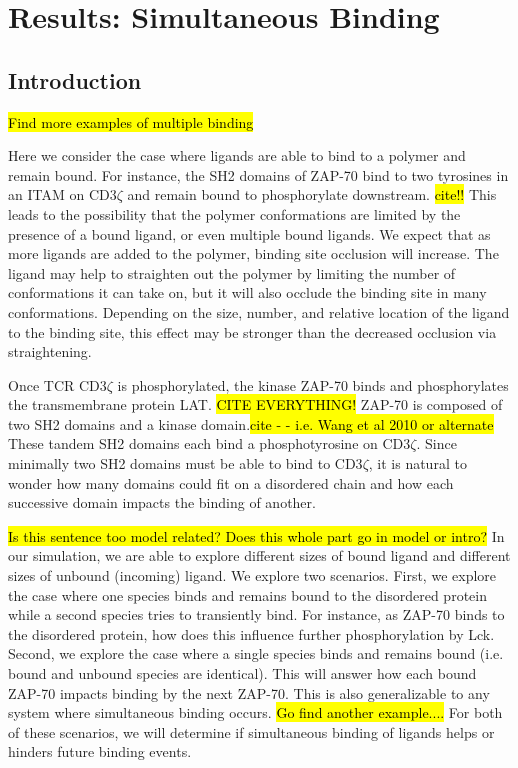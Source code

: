 \documentclass[../../AdvancementSummary.tex]{subfiles}
\begin{document}
\section{Results: Simultaneous Binding}
\label{sec: SimultaneousBinding}
\subsection{Introduction}

\hl{Find more examples of multiple binding}

Here we consider the case where ligands are able to bind to a polymer and remain bound.  For instance, the SH2 domains of ZAP-70 bind to two tyrosines in an ITAM on CD3$\zeta$ and remain bound to phosphorylate downstream. \hl{cite!!} This leads to the possibility that the polymer conformations are limited by the presence of a bound ligand, or even multiple bound ligands.  We expect that as more ligands are added to the polymer, binding site occlusion will increase.  The ligand may help to straighten out the polymer by limiting the number of conformations it can take on, but it will also occlude the binding site in many conformations.  Depending on the size, number, and relative location of the ligand to the binding site, this effect may be stronger than the decreased occlusion via straightening.  

Once TCR CD3$\zeta$ is phosphorylated, the kinase ZAP-70 binds and phosphorylates the transmembrane protein LAT. \hl{CITE EVERYTHING!} ZAP-70 is composed of two SH2 domains and a kinase domain.\hl{cite -  - i.e. Wang et al 2010 or alternate} These tandem SH2 domains each bind a phosphotyrosine on CD3$\zeta$. Since minimally two SH2 domains must be able to bind to CD3$\zeta$, it is natural to wonder how many domains could fit on a disordered chain and how each successive domain impacts the binding of another. 

\hl{Is this sentence too model related? Does this whole part go in model or intro?} In our simulation, we are able to explore different sizes of bound ligand and different sizes of unbound (incoming) ligand. We explore two scenarios. First, we explore the case where one species binds and remains bound to the disordered protein while a second species tries to transiently bind. For instance, as ZAP-70 binds to the disordered protein, how does this influence further phosphorylation by Lck. Second, we explore the case where a single species binds and remains bound (i.e. bound and unbound species are identical). This will answer how each bound ZAP-70 impacts binding by the next ZAP-70.  This is also generalizable to any system where simultaneous binding occurs. \hl{Go find another example....} For both of these scenarios, we will determine if simultaneous binding of ligands helps or hinders future binding events. 
\end{document}
